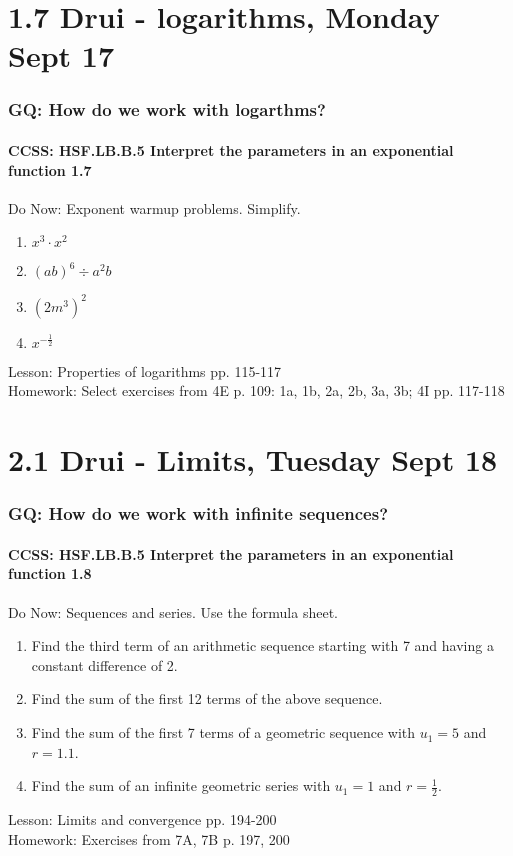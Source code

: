 \documentclass{beamer}
\begin{document}
\section{1.7 Drui - logarithms, Monday Sept 17}
  \frame
  {
    \frametitle{GQ: How do we work with logarthms?}
    \framesubtitle{CCSS: HSF.LB.B.5 Interpret the parameters in an exponential function  \alert{1.7}}

    \begin{block}{Do Now: Exponent warmup problems. Simplify.}
      \begin{enumerate}
      \item $x^3 \cdot x^2$
      \item $(ab)^6 \div a^2 b$
      \item $(2m^3)^2$
      \item $\displaystyle x^{-\frac{1}{2}}$
      \end{enumerate}
   \end{block}
    Lesson: Properties of logarithms pp. 115-117\\ \bigskip
    Homework: Select exercises from 4E p. 109: 1a, 1b, 2a, 2b, 3a, 3b; 4I pp. 117-118
  }

\section{2.1 Drui - Limits, Tuesday Sept 18}
  \frame
  {
    \frametitle{GQ: How do we work with infinite sequences?}
    \framesubtitle{CCSS: HSF.LB.B.5 Interpret the parameters in an exponential function  \alert{1.8}}

    \begin{block}{Do Now: Sequences and series. Use the formula sheet.}
      \begin{enumerate}
      \item Find the third term of an arithmetic sequence starting with 7 and having a constant difference of 2.
      \item Find the sum of the first 12 terms of the above sequence.
      \item Find the sum of the first 7 terms of a geometric sequence with $u_1=5$ and $r=1.1$.
      \item Find the sum of an infinite geometric series with $u_1=1$ and $r=\frac{1}{2}$.
      \end{enumerate}
   \end{block}
    Lesson: Limits and convergence pp. 194-200\\ \bigskip
    Homework: Exercises from 7A, 7B p. 197, 200
  }

  
\end{document}
